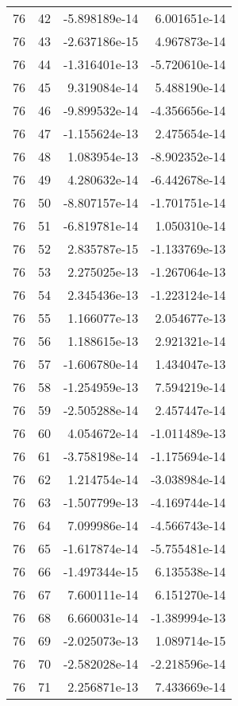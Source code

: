 \begin{tabular}{rrrr}
  76 &   42 & -5.898189e-14 &  6.001651e-14 \\
  76 &   43 & -2.637186e-15 &  4.967873e-14 \\
  76 &   44 & -1.316401e-13 & -5.720610e-14 \\
  76 &   45 &  9.319084e-14 &  5.488190e-14 \\
  76 &   46 & -9.899532e-14 & -4.356656e-14 \\
  76 &   47 & -1.155624e-13 &  2.475654e-14 \\
  76 &   48 &  1.083954e-13 & -8.902352e-14 \\
  76 &   49 &  4.280632e-14 & -6.442678e-14 \\
  76 &   50 & -8.807157e-14 & -1.701751e-14 \\
  76 &   51 & -6.819781e-14 &  1.050310e-14 \\
  76 &   52 &  2.835787e-15 & -1.133769e-13 \\
  76 &   53 &  2.275025e-13 & -1.267064e-13 \\
  76 &   54 &  2.345436e-13 & -1.223124e-14 \\
  76 &   55 &  1.166077e-13 &  2.054677e-13 \\
  76 &   56 &  1.188615e-13 &  2.921321e-14 \\
  76 &   57 & -1.606780e-14 &  1.434047e-13 \\
  76 &   58 & -1.254959e-13 &  7.594219e-14 \\
  76 &   59 & -2.505288e-14 &  2.457447e-14 \\
  76 &   60 &  4.054672e-14 & -1.011489e-13 \\
  76 &   61 & -3.758198e-14 & -1.175694e-14 \\
  76 &   62 &  1.214754e-14 & -3.038984e-14 \\
  76 &   63 & -1.507799e-13 & -4.169744e-14 \\
  76 &   64 &  7.099986e-14 & -4.566743e-14 \\
  76 &   65 & -1.617874e-14 & -5.755481e-14 \\
  76 &   66 & -1.497344e-15 &  6.135538e-14 \\
  76 &   67 &  7.600111e-14 &  6.151270e-14 \\
  76 &   68 &  6.660031e-14 & -1.389994e-13 \\
  76 &   69 & -2.025073e-13 &  1.089714e-15 \\
  76 &   70 & -2.582028e-14 & -2.218596e-14 \\
  76 &   71 &  2.256871e-13 &  7.433669e-14 \\

\end{tabular}
